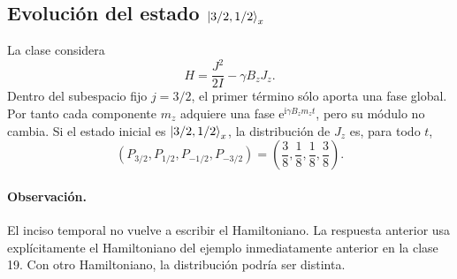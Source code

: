 \documentclass[11pt,a4paper]{article}
\numberwithin{equation}{section}
\renewcommand{\boxed}[1]{#1}
\newcommand{\ii}{\mathrm i}
\newcommand{\e}{\mathrm e}
\begin{document}
\subsection{Evolución del estado $\ket{3/2,1/2}_x$}
La clase considera
\begin{equation}
H=\frac{J^2}{2I}-\gamma B_zJ_z.
\end{equation}
Dentro del subespacio fijo $j=3/2$, el primer término sólo aporta una fase global. Por tanto cada componente $m_z$ adquiere una fase $\e^{\ii\gamma B_zm_zt}$, pero su módulo no cambia. Si el estado inicial es $\ket{3/2,1/2}_x$, la distribución de $J_z$ es, para todo $t$,
\begin{equation}
\boxed{(P_{3/2},P_{1/2},P_{-1/2},P_{-3/2})=
\left(\frac38,\frac18,\frac18,\frac38\right).}
\end{equation}

\paragraph{Observación.}
El inciso temporal no vuelve a escribir el Hamiltoniano. La respuesta anterior usa explícitamente el Hamiltoniano del ejemplo inmediatamente anterior en la clase 19. Con otro Hamiltoniano, la distribución podría ser distinta.
\end{document}
